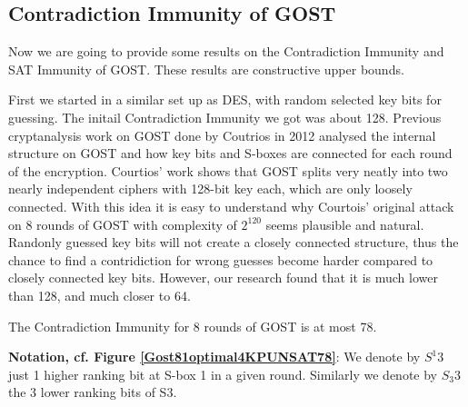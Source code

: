 \subsection{Contradiction Immunity of GOST} 
Now we are going to provide some results on the Contradiction Immunity and SAT Immunity of GOST. These results are constructive upper bounds.

First we started in a similar set up as DES, with random selected key bits for guessing. The initail Contradiction Immunity we got was about 128. Previous cryptanalysis work on GOST done by Coutrios in 2012 \cite{gostdc2} analysed the internal structure on GOST and how key bits and S-boxes are connected for each round of the encryption. Courtios' work \cite{gostdc2} shows that GOST splits very neatly into two nearly independent ciphers with 128-bit key each, which are only loosely connected. With this idea it is easy to understand why Courtois' original attack on 8 rounds of GOST with complexity of $2^{120}$ \cite{gostreport} seems plausible and natural. Randonly guessed key bits will not create a closely connected structure, thus the chance to find a contridiction for wrong guesses become harder compared to closely connected key bits.
However, our research found that it is much lower than 128,
and much closer to 64. 
\begin{lemma}
	The Contradiction Immunity for 8 rounds of GOST is at most 78.
\end{lemma}


{\bf Notation, cf. Figure \ref{Gost81optimal4KPUNSAT78}}:
We denote by $S^{1}3$ just 1 higher ranking bit at S-box 1 in a given round.
Similarly we denote by $S_{3}3$ the 3 lower ranking bits of S3.

